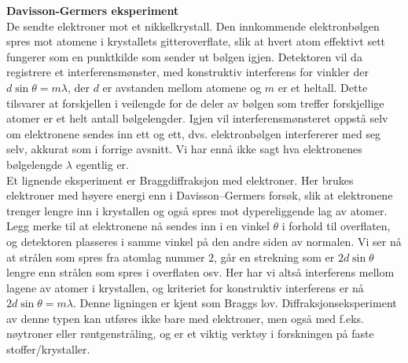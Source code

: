 \documentclass[8pt, A4paper, norsk]{extarticle}
\begin{document}
\begin{multicols*}{3}
\centering \textbf{Davisson-Germers eksperiment} \\
De sendte elektroner mot et nikkelkrystall. Den innkommende elektronbølgen spres mot atomene i krystallets gitteroverflate, slik at hvert atom effektivt sett fungerer som en punktkilde som sender ut bølgen igjen. Detektoren vil da registrere et interferensmønster, med konstruktiv interferens for vinkler der
$d \sin \theta = m \lambda$, der $d$ er avstanden mellom atomene og $m$ er et heltall. Dette tilsvarer at forskjellen i veilengde for de deler av bølgen som treffer forskjellige atomer er et helt antall bølgelengder. Igjen vil interferensmønsteret oppstå selv om elektronene sendes inn ett og ett, dvs. elektronbølgen interfererer med seg selv, akkurat som i forrige avsnitt. Vi har ennå ikke sagt hva elektronenes bølgelengde $\lambda$ egentlig er. \\
Et lignende eksperiment er Braggdiffraksjon med elektroner. Her brukes elektroner med høyere energi enn i Davisson–Germers forsøk, slik at elektronene trenger lengre inn i krystallen og også spres mot dypereliggende lag av atomer. Legg merke til at elektronene nå sendes inn i en vinkel $\theta$ i forhold til overflaten, og detektoren plasseres i samme vinkel på den andre siden av normalen. Vi ser nå at strålen som spres fra atomlag nummer $2$, går en strekning som er $2d \sin \theta$ lengre enn strålen som spres i overflaten osv. Her har vi altså interferens mellom lagene av atomer i krystallen, og kriteriet for konstruktiv interferens er nå $2d \sin \theta = m \lambda$. Denne ligningen er kjent som Braggs lov. Diffraksjonseksperiment av denne typen kan utføres ikke bare med elektroner, men også med f.eks. nøytroner eller røntgenstråling, og er et viktig verktøy i forskningen på faste stoffer/krystaller.

\vspace{2mm}


\end{multicols*}
\end{document}
